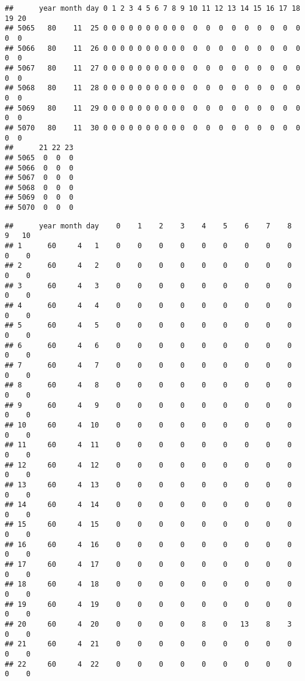 \documentclass[]{article}
\begin{document}
\begin{verbatim}
##      year month day 0 1 2 3 4 5 6 7 8 9 10 11 12 13 14 15 16 17 18 19 20
## 5065   80    11  25 0 0 0 0 0 0 0 0 0 0  0  0  0  0  0  0  0  0  0  0  0
## 5066   80    11  26 0 0 0 0 0 0 0 0 0 0  0  0  0  0  0  0  0  0  0  0  0
## 5067   80    11  27 0 0 0 0 0 0 0 0 0 0  0  0  0  0  0  0  0  0  0  0  0
## 5068   80    11  28 0 0 0 0 0 0 0 0 0 0  0  0  0  0  0  0  0  0  0  0  0
## 5069   80    11  29 0 0 0 0 0 0 0 0 0 0  0  0  0  0  0  0  0  0  0  0  0
## 5070   80    11  30 0 0 0 0 0 0 0 0 0 0  0  0  0  0  0  0  0  0  0  0  0
##      21 22 23
## 5065  0  0  0
## 5066  0  0  0
## 5067  0  0  0
## 5068  0  0  0
## 5069  0  0  0
## 5070  0  0  0
\end{verbatim}

\begin{verbatim}
##      year month day    0    1    2    3    4    5    6    7    8    9   10
## 1      60     4   1    0    0    0    0    0    0    0    0    0    0    0
## 2      60     4   2    0    0    0    0    0    0    0    0    0    0    0
## 3      60     4   3    0    0    0    0    0    0    0    0    0    0    0
## 4      60     4   4    0    0    0    0    0    0    0    0    0    0    0
## 5      60     4   5    0    0    0    0    0    0    0    0    0    0    0
## 6      60     4   6    0    0    0    0    0    0    0    0    0    0    0
## 7      60     4   7    0    0    0    0    0    0    0    0    0    0    0
## 8      60     4   8    0    0    0    0    0    0    0    0    0    0    0
## 9      60     4   9    0    0    0    0    0    0    0    0    0    0    0
## 10     60     4  10    0    0    0    0    0    0    0    0    0    0    0
## 11     60     4  11    0    0    0    0    0    0    0    0    0    0    0
## 12     60     4  12    0    0    0    0    0    0    0    0    0    0    0
## 13     60     4  13    0    0    0    0    0    0    0    0    0    0    0
## 14     60     4  14    0    0    0    0    0    0    0    0    0    0    0
## 15     60     4  15    0    0    0    0    0    0    0    0    0    0    0
## 16     60     4  16    0    0    0    0    0    0    0    0    0    0    0
## 17     60     4  17    0    0    0    0    0    0    0    0    0    0    0
## 18     60     4  18    0    0    0    0    0    0    0    0    0    0    0
## 19     60     4  19    0    0    0    0    0    0    0    0    0    0    0
## 20     60     4  20    0    0    0    0    8    0   13    8    3    0    0
## 21     60     4  21    0    0    0    0    0    0    0    0    0    0    0
## 22     60     4  22    0    0    0    0    0    0    0    0    0    0    0

\end{verbatim}
\end{document}
